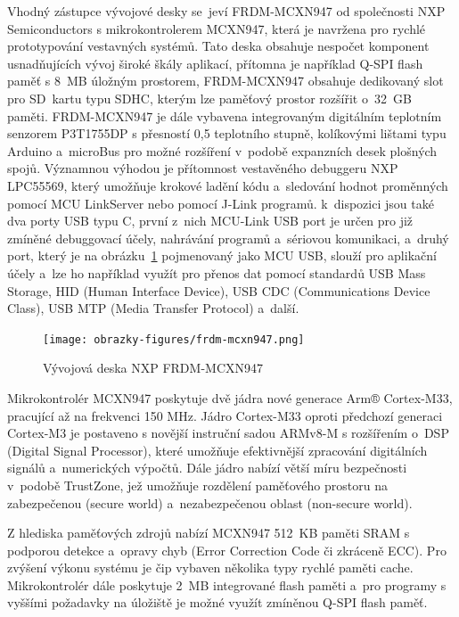 Vhodný zástupce vývojové desky se~jeví FRDM-MCXN947 od společnosti NXP Semiconductors s mikrokontrolerem MCXN947, která je navržena pro rychlé prototypování vestavných systémů. Tato deska obsahuje nespočet komponent usnadňujících vývoj široké škály aplikací, přítomna je například Q-SPI flash paměť s 8~MB úložným prostorem, FRDM-MCXN947 obsahuje dedikovaný slot pro SD~kartu typu SDHC, kterým lze paměťový prostor rozšířit o~32~GB paměti. FRDM-MCXN947 je dále vybavena integrovaným digitálním teplotním senzorem P3T1755DP s přesností 0,5 teplotního stupně, kolíkovými lištami typu Arduino a~microBus pro možné rozšíření v~podobě expanzních desek plošných spojů. Významnou výhodou je přítomnost vestavěného debuggeru NXP LPC55569, který umožňuje krokové ladění kódu a~sledování hodnot proměnných pomocí MCU LinkServer nebo pomocí J-Link programů. k~dispozici jsou také dva porty USB typu C, první z~nich MCU-Link USB port je určen pro již zmíněné debuggovací účely, nahrávání programů a~sériovou komunikaci, a~druhý port, který je na obrázku~\ref{fig:frdm-mcxn947} pojmenovaný jako MCU USB, slouží pro aplikační účely a~lze ho například využít pro přenos dat pomocí standardů USB Mass Storage, HID (Human Interface Device), USB CDC (Communications Device Class), USB MTP (Media Transfer Protocol) a~další.~\cite{nxp_FRDM_MCXN947_getting_started, nxp_MCX_Nx4x_Reference_Manual}

\begin{figure}[h]
    \centering
    \texttt{[image: obrazky-figures/frdm-mcxn947.png]}
    
    \caption{Vývojová deska NXP FRDM-MCXN947~\cite{nxp_FRDM_MCXN947_getting_started}}
    \label{fig:frdm-mcxn947}
\end{figure}

Mikrokontrolér MCXN947 poskytuje dvě jádra nové generace Arm® Cortex-M33, pracující až na frekvenci 150 MHz. Jádro Cortex-M33 oproti předchozí generaci Cortex-M3 je postaveno s novější instruční sadou ARMv8-M s rozšířením o~DSP (Digital Signal Processor), které umožňuje efektivnější zpracování digitálních signálů a~numerických výpočtů. Dále jádro nabízí větší míru bezpečnosti v~podobě TrustZone, jež umožňuje rozdělení paměťového prostoru na zabezpečenou (secure world) a~nezabezpečenou oblast (non-secure world).~\cite{nxp_MCX_Nx4x_Reference_Manual}

Z hlediska paměťových zdrojů nabízí MCXN947 512~KB paměti SRAM s podporou detekce a~opravy chyb (Error Correction Code či zkráceně ECC). Pro zvýšení výkonu systému je čip vybaven několika typy rychlé paměti cache. Mikrokontrolér dále poskytuje 2~MB integrované flash paměti a~pro programy s vyššími požadavky na úložiště je možné využít zmíněnou Q-SPI flash paměť.~\cite{nxp_MCX_Nx4x_Reference_Manual}


